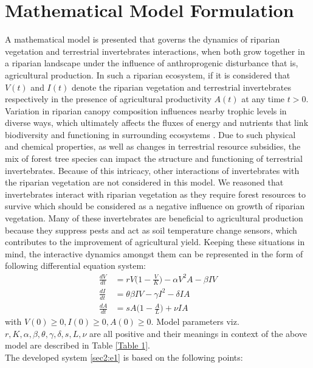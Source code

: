 \documentclass[12pt]{article}
\numberwithin{equation}{section}
\begin{document}
\section{Mathematical Model Formulation}
A mathematical model is presented that governs the dynamics of riparian vegetation and terrestrial invertebrates interactions, when both grow together in a riparian landscape under the influence of anthroprogenic disturbance that is, agricultural production. In such a riparian ecosystem, if it is considered that $V(t)$ and $I(t)$ denote the riparian vegetation and terrestrial invertebrates respectively in the presence of agricultural productivity $A(t)$ at any time $t>0$. Variation in riparian canopy composition influences nearby trophic levels in diverse ways, which ultimately affects the fluxes of energy and nutrients that link biodiversity and functioning in surrounding ecosystems \cite{kominoski2011}. Due to such physical and chemical properties, as well as changes in terrestrial resource subsidies, the mix of forest tree species can impact the structure and functioning of terrestrial invertebrates. Because of this intricacy, other interactions of invertebrates with the riparian vegetation are not considered in this model. We reasoned that invertebrates interact with riparian vegetation as they require forest resources to survive which should be considered as a negative influence on growth of riparian vegetation. Many of these invertebrates are beneficial to agricultural production because they suppress pests and act as soil temperature change sensors, which contributes to the improvement of agricultural yield. Keeping these situations in mind, the interactive dynamics amongst them can be represented in the form of following differential equation system:
\begin{subequations}\label{sec2:e1}
	\begin{align}
	\frac{dV}{dt}&=rV\bigg(1-\frac{V}{K}\bigg)-\alpha V^2A -\beta IV\\
	\frac{dI}{dt}&=\theta \beta IV -\gamma I^2 - \delta IA\\
	\frac{dA}{dt}&= sA\bigg(1-\frac{A}{L}\bigg)+\nu IA
	\end{align}
\end{subequations}
with $V(0) \geq 0, I(0)\geq 0, A(0)\geq 0$. Model parameters viz. $r, K, \alpha, \beta, \theta, \gamma, \delta, s, L, \nu$ are all positive and their meanings in context of the above model are described in Table \ref{Table 1}.  \\
The developed system \eqref{sec2:e1} is based on the following points:
\end{document}
